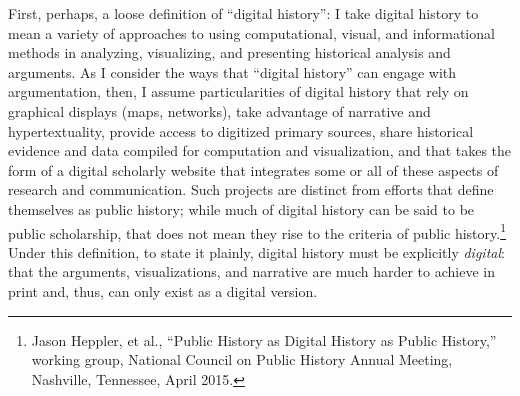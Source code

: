 \documentclass[11pt,]{article}
\begin{document}
\noindent  First, perhaps, a loose definition of ``digital history'': I take
digital history to mean a variety of approaches to using computational,
visual, and informational methods in analyzing, visualizing, and
presenting historical analysis and arguments. As I consider the ways
that ``digital history'' can engage with argumentation, then, I assume
particularities of digital history that rely on graphical displays
(maps, networks), take advantage of narrative and hypertextuality,
provide access to digitized primary sources, share historical evidence
and data compiled for computation and visualization, and that takes the
form of a digital scholarly website that integrates some or all of these
aspects of research and communication. Such projects are distinct from
efforts that define themselves as public history; while much of digital
history can be said to be public scholarship, that does not mean they
rise to the criteria of public history.\footnote{Jason Heppler, et al.,
  ``Public History as Digital History as Public History,'' working
  group, National Council on Public History Annual Meeting, Nashville,
  Tennessee, April 2015.} Under this definition, to state it plainly,
digital history must be explicitly \emph{digital}: that the arguments,
visualizations, and narrative are much harder to achieve in print and,
thus, can only exist as a digital version.
\end{document}
